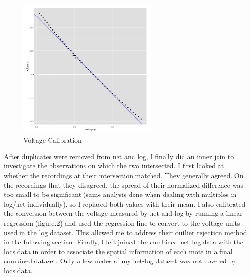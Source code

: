 \documentclass[english]{article}\usepackage[]{graphicx}\usepackage[]{color}
\begin{document}
\begin{figure}
\vspace{-30pt}
  \begin{center}
    \includegraphics[height = 200pt]{voltagecalibration.png}
  \end{center}
  \vspace{-20pt}
  \caption{Voltage Calibration}
     \vspace{-20pt}
\end{figure}

After duplicates were removed from net and log, I finally did an inner join to investigate the observations on which the two intersected. I first looked at whether the recordings at their intersection matched. They generally agreed. On the recordings that they disagreed, the spread of their normalized difference was too small to be significant (same analysis done when dealing with multiples in log/net individually), so I replaced both values with their mean. I also calibrated the conversion between the voltage measured by net and log by running a linear regression (figure.2) and used the regression line to convert to the voltage units used in the log dataset.  This allowed me to address their outlier rejection method in the following section. Finally, I left joined the combined net-log data with the locs data in order to associate the spatial information of each mote in a final combined dataset. Only a few nodes of my net-log dataset was not covered by locs data.  
\end{document}
